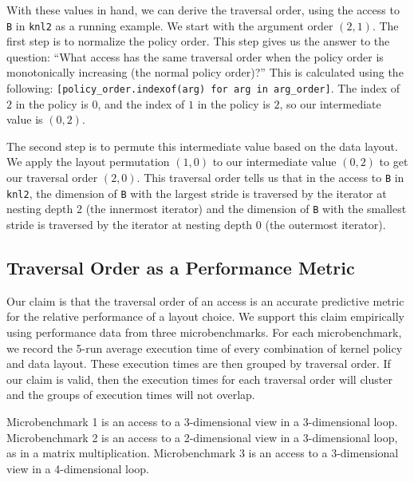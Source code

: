 \documentclass[sigconf, table]{acmart}
\begin{document}
With these values in hand, we can derive the traversal order, using the access to \verb.B. in \verb.knl2. as a running example. 
We start with the argument order $(2,1)$.
The first step is to normalize the policy order.
This step gives us the answer to the question: \enquote{What access has the same traversal order when the policy order is monotonically increasing (the normal policy order)?}
This is calculated using the following: \verb,[policy_order.indexof(arg) for arg in arg_order],. 
The index of $2$ in the policy is $0$, and the index of $1$ in the policy is $2$, so our intermediate value is $(0,2)$. 

The second step is to permute this intermediate value based on the data layout. 
We apply the layout permutation $(1,0)$ to our intermediate value $(0,2)$ to get our traversal order $(2,0)$. 
This traversal order tells us that in the access to \verb.B. in \verb.knl2., the dimension of \verb.B. with the largest stride is traversed by the iterator at nesting depth 2 (the innermost iterator) and the dimension of \verb.B. with the smallest stride is traversed by the iterator at nesting depth 0 (the outermost iterator). 

\subsection{Traversal Order as a Performance Metric}

Our claim is that the traversal order of an access is an accurate predictive metric for the relative performance of a layout choice. 
We support this claim empirically using performance data from three microbenchmarks.
For each microbenchmark, we record the 5-run average execution time of every combination of kernel policy and data layout. 
These execution times are then grouped by traversal order.
If our claim is valid, then the execution times for each traversal order will cluster and the groups of execution times will not overlap.

Microbenchmark 1 is an access to a 3-dimensional view in a 3-dimensional loop. 
Microbenchmark 2 is an access to a 2-dimensional view in a 3-dimensional loop, as in a matrix multiplication.
Microbenchmark 3 is an access to a 3-dimensional view in a 4-dimensional loop.
\end{document}
